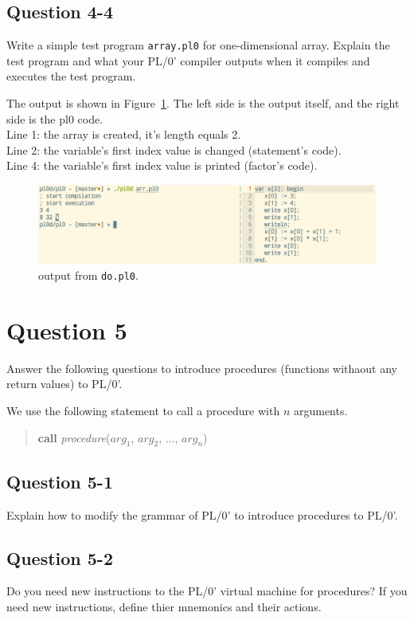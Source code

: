 \documentclass{article}
\begin{document}
\subsection*{Question 4-4}
Write a simple test program {\tt array.pl0} for one-dimensional array.
Explain the test program and what your PL/0' compiler outputs when it
compiles and executes the test program.


\ifreport
The output is shown in Figure~\ref{fig:q44}. The left side is the output itself, and the right side is the pl0 code.\\
Line 1: the array is created, it's length equals 2. \\
Line 2: the variable's first index value is changed (statement's code).\\
Line 4: the variable's first index value is printed (factor's code).\\
\begin{figure}[h]
  \includegraphics[scale=0.35]{./img/Q4-4.png}
  \centering
  \caption{output from {\tt do.pl0}.}
  \label{fig:q44}
\end{figure}
\fi


\newpage
\section*{Question 5}
Answer the following questions to introduce procedures (functions withaout any return values) to PL/0'.

We use the following statement to call a procedure with $n$ arguments.
\begin{quote}
 {\bf call} {\it procedure}($arg_1$, $arg_2$, $\dots$, $arg_n$)
\end{quote}


\subsection*{Question 5-1}
Explain how to modify the grammar of PL/0' to introduce procedures to PL/0'.

\subsection*{Question 5-2}
Do you need new instructions to the PL/0' virtual machine for procedures?
If you need new instructions, define thier mnemonics and their actions. 
\end{document}
